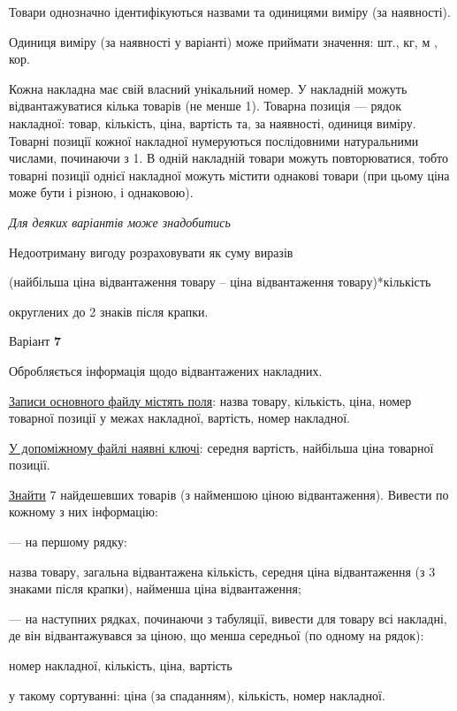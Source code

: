 \documentclass[11pt, ukrainian]{article}
\begin{document}
Товари однозначно ідентифікуються назвами та одиницями виміру (за наявності).

Одиниця виміру (за наявності у варіанті) може приймати значення: шт., кг, м , кор.

Кожна накладна має свій власний унікальний номер.
У накладній можуть відвантажуватися кілька товарів (не менше 1).
Товарна позиція --- рядок накладної: товар, кількість, ціна, вартість та, за наявності, одиниця виміру.
Товарні позиції кожної накладної нумеруються послідовними натуральними числами, починаючи з 1.
В одній накладній товари можуть повторюватися, 
тобто товарні позиції однієї накладної можуть містити однакові товари 
(при цьому ціна може бути і різною, і однаковою).

\bigskip\textit{Для деяких варіантів може знадобитись}

Недоотриману вигоду розраховувати як суму виразів
{\center (найбільша ціна відвантаження товару – ціна відвантаження товару)*кількість\par}

\bigskip
{\noindent} округлених до 2 знаків після крапки.


\par
\newpage
{\center Варіант  \No \textbf { 7 }\par}
\bigskip
Обробляється інформація щодо відвантажених накладних.

\underline{Записи основного файлу містять поля}: назва товару, кількість, ціна, номер товарної позиції у межах накладної, вартість, номер накладної.

\underline{У допоміжному файлі наявні ключі}: середня вартість, найбільша ціна товарної позиції.

\underline{Знайти} 7 найдешевших товарів (з найменшою ціною відвантаження). Вивести по кожному з них інформацію:\par
{\noindent}--- на першому рядку:\par
назва товару, загальна відвантажена кількість, середня ціна відвантаження (з 3 знаками після крапки), найменша ціна відвантаження;

{\noindent}--- на наступних рядках, починаючи з табуляції, вивести для товару всі накладні, де він відвантажувався за ціною, що менша середньої (по одному на рядок):\par
номер накладної, кількість, ціна, вартість

{\noindent}у такому сортуванні: ціна (за спаданням), кількість, номер накладної.
\end{document}
